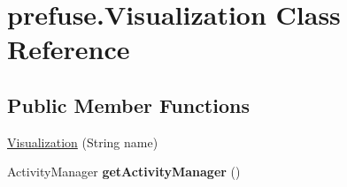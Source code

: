 \hypertarget{classprefuse_1_1_visualization}{\section{prefuse.\-Visualization \-Class \-Reference}
\label{classprefuse_1_1_visualization}
}
\subsection*{\-Public \-Member \-Functions}
\begin{DoxyCompactItemize}
\item 
\hyperlink{classprefuse_1_1_visualization_a026a5f8c09b96cd8ed7e14e34b32ae65}{\-Visualization} (\-String name)
\item 
\hypertarget{classprefuse_1_1_visualization_acae01a84c1f9fd71ed9fa5cbc9a3ffc6}{\-Activity\-Manager {\bfseries get\-Activity\-Manager} ()}\label{classprefuse_1_1_visualization_acae01a84c1f9fd71ed9fa5cbc9a3ffc6}


\end{DoxyCompactItemize}
